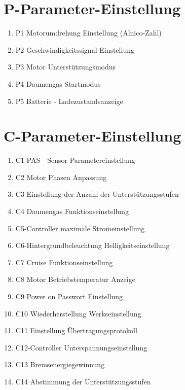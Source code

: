 \section{P-Parameter-Einstellung}
\begin{enumerate}[label=\arabic*.]
    \item P1 Motorumdrehung Einstellung (Alnico-Zahl)
    \item P2 Geschwindigkeitssignal Einstellung
    \item P3 Motor Unterstützungsmodus
    \item P4 Daumengas Startmodus
    \item P5 Batterie - Ladezustandsanzeige
\end{enumerate}

\section{C-Parameter-Einstellung}
\begin{enumerate}[label=\arabic*.]
    \item C1 PAS - Sensor Parametereinstellung
    \item C2 Motor Phasen Anpassung
    \item C3 Einstellung der Anzahl der Unterstützungsstufen
    \item C4 Daumengas Funktionseinstellung
    \item C5-Controller maximale Stromeinstellung
    \item C6-Hintergrundbeleuchtung Helligkeitseinstellung
    \item C7 Cruise Funktionseinstellung
    \item C8 Motor Betriebstemperatur Anzeige
    \item C9 Power on Passwort Einstellung
    \item C10 Wiederherstellung Werkseinstellung
    \item C11 Einstellung Übertragungsprotokoll
    \item C12-Controller Unterspannungseinstellung
    \item C13 Bremsenergiegewinnung
    \item C14 Abstimmung der Unterstützungsstufen
\end{enumerate}

